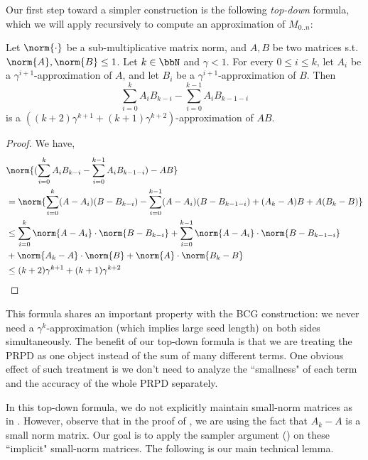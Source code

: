 Our first step toward a simpler construction is the following \emph{top-down} formula, which we will apply recursively to compute an approximation of $M_{0..n}$:
\begin{lemma}\label{lemma:main}
Let $\norm{\cdot}$ be a sub-multiplicative matrix norm, and $A,B$ be two matrices s.t. $\norm{A},\norm{B}\le 1$. Let $k\in\bbN$ and $\gamma<1$. For every $0\le i\le k$, let $A_i$ be a $\gamma^{i+1}$-approximation of $A$, and let $B_i$ be a $\gamma^{i+1}$-approximation of $B$. Then $$\sum_{i=0}^k A_{i}B_{k-i}-\sum_{i=0}^{k-1} A_{i}B_{k-1-i}$$ is a $((k+2)\gamma^{k+1}+(k+1)\gamma^{k+2})$-approximation of $AB$.
\end{lemma}
\begin{proof}
We have,
\begin{align*}
&\norm{ (\sum_{i=0}^k A_{i}B_{k-i}-\sum_{i=0}^{k-1} A_{i}B_{k-1-i})-AB}\\
 &= \norm{ \sum_{i=0}^k (A-A_{i})(B-B_{k-i})-\sum_{i=0}^{k-1} (A-A_{i})(B-B_{k-1-i})+(A_k-A)B+A(B_k-B)}\\
 &\le \sum_{i=0}^k \norm{A-A_i}\cdot\norm{B-B_{k-i}}+\sum_{i=0}^{k-1}\norm{A-A_{i}}\cdot\norm{B-B_{k-1-i}}\\
 &+\norm{A_k-A}\cdot\norm{B}+\norm{A}\cdot\norm{B_k-B}\\
 &\le(k+2)\gamma^{k+1}+(k+1)\gamma^{k+2}
\end{align*}
\end{proof}
This formula shares an important property with the BCG construction: we never need a $\gamma^k$-approximation (which implies large seed length) on both sides simultaneously. The benefit of our top-down formula is that we are treating the PRPD as one object instead of the sum of many different terms. One obvious effect of such treatment is we don't need to analyze the ``smallness" of each term and the accuracy of the whole PRPD separately. 

In this top-down formula, we do not explicitly maintain small-norm matrices as in \cite{BCG18}. However, observe that in the proof of , we are using the fact that $A_k-A$ is a small norm matrix. Our goal is to apply the sampler argument () on these ``implicit" small-norm matrices. The following is our main technical lemma.

